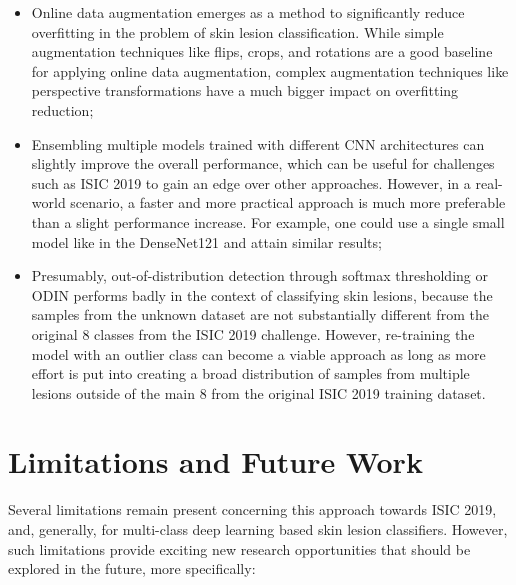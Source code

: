 \begin{itemize}
        \item Online data augmentation emerges as a method to significantly reduce overfitting in the problem of skin lesion classification. While simple augmentation techniques like flips, crops, and rotations are a good baseline for applying online data augmentation, complex augmentation techniques like perspective transformations have a much bigger impact on overfitting reduction;
        
        \item Ensembling multiple models trained with different \ac{CNN} architectures can slightly improve the overall performance, which can be useful for challenges such as \ac{ISIC} 2019 to gain an edge over other approaches. However, in a real-world scenario, a faster and more practical approach is much more preferable than a slight performance increase. For example, one could use a single small model like in the DenseNet121 and attain similar results;
        
        \item Presumably, out-of-distribution detection through softmax thresholding or \ac{ODIN} performs badly in the context of classifying skin lesions, because the samples from the unknown dataset are not substantially different from the original 8 classes from the \ac{ISIC} 2019 challenge. However,  re-training the model with an outlier class can become a viable approach as long as more effort is put into creating a broad distribution of samples from multiple lesions outside of the main 8 from the original \ac{ISIC} 2019 training dataset.
    \end{itemize}

\section{Limitations and Future Work}

    Several limitations remain present concerning this approach towards \ac{ISIC} 2019, and, generally, for multi-class deep learning based skin lesion classifiers. However, such limitations provide exciting new research opportunities that should be explored in the future, more specifically:

